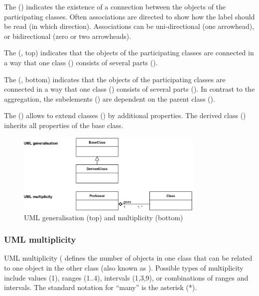 The  () indicates the existence of a connection between the objects of the participating classes. Often associations are directed to show how the label should be read (in which direction). Associations can be uni-directional (one arrowhead), or bidirectional (zero or two arrowheads).
  
The  (, top) indicates that the objects of the participating classes are connected in a way that one class () consists of several parts ().

The  (, bottom) indicates that the objects of the participating classes are connected in a way that one class () consists of several parts (). In contrast to the aggregation, the subelements () are dependent on the parent class ().

The  () allows to extend classes () by additional properties. The derived class () inherits all properties of the base class.

\begin{figure}[h]
	\centering
	\includegraphics[width=0.8\textwidth]{images/uml/umlGeneralisation}
	\caption{UML generalisation (top) and multiplicity (bottom)}
	\label{fig:umlGeneralisation}
\end{figure}


\subsubsection{UML multiplicity}
UML multiplicity ( defines the number of objects in one class that can be related to one object in the other class (also known as ). Possible types of multiplicity include values (1), ranges (1$..$4), intervals (1,3,9), or combinations of ranges and intervals. The standard notation for ``many'' is the asterisk (*). 

